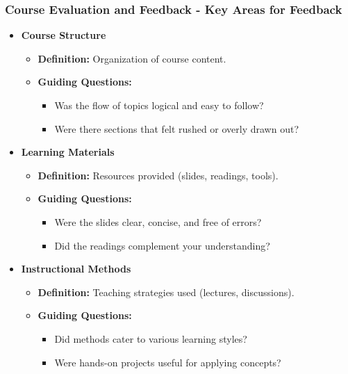 \documentclass[aspectratio=169]{beamer}
\begin{document}
\begin{frame}[fragile]
    \frametitle{Course Evaluation and Feedback - Key Areas for Feedback}
    \begin{itemize}
        \item \textbf{Course Structure}
        \begin{itemize}
            \item \textbf{Definition:} Organization of course content.
            \item \textbf{Guiding Questions:}
            \begin{itemize}
                \item Was the flow of topics logical and easy to follow?
                \item Were there sections that felt rushed or overly drawn out?
            \end{itemize}
        \end{itemize}
        \item \textbf{Learning Materials}
        \begin{itemize}
            \item \textbf{Definition:} Resources provided (slides, readings, tools).
            \item \textbf{Guiding Questions:}
            \begin{itemize}
                \item Were the slides clear, concise, and free of errors?
                \item Did the readings complement your understanding?
            \end{itemize}
        \end{itemize}
        \item \textbf{Instructional Methods}
        \begin{itemize}
            \item \textbf{Definition:} Teaching strategies used (lectures, discussions).
            \item \textbf{Guiding Questions:}
            \begin{itemize}
                \item Did methods cater to various learning styles?
                \item Were hands-on projects useful for applying concepts?
            \end{itemize}
        \end{itemize}
    \end{itemize}
\end{frame}
\end{document}
